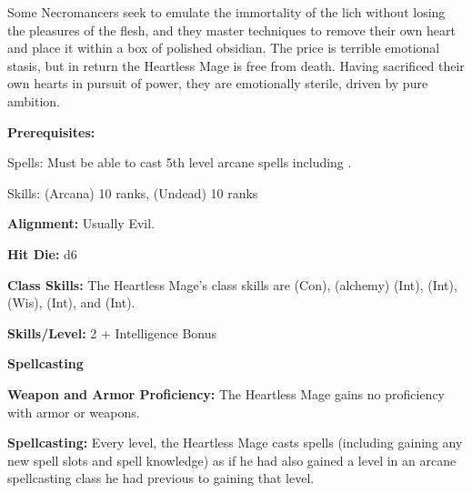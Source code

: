 
Some Necromancers seek to emulate the immortality of the lich without losing the pleasures of the flesh, and they master techniques to remove their own heart and place it within a box of polished obsidian. The price is terrible emotional stasis, but in return the Heartless Mage is free from death. Having sacrificed their own hearts in pursuit of power, they are emotionally sterile, driven by pure ambition.

\textbf{Prerequisites:} 
\begin{description*}
\item[\hspace*{1.5cm}Spells:] Must be able to cast 5th level arcane spells including .
\item[\hspace*{1.5cm}Skills:]  (Arcana) 10 ranks,  (Undead) 10 ranks
\end{description*}

\textbf{Alignment:} Usually Evil.

\textbf{Hit Die:} d6

\textbf{Class Skills:} The Heartless Mage's class skills are  (Con),  (alchemy) (Int),  (Int),  (Wis),  (Int), and  (Int).

\textbf{Skills/Level:} 2 + Intelligence Bonus

\poorbab{}
\poorfor{}
\poorref{}
\goodwil{}

\begin{extraclasstable}{\textbf{Spellcasting}}
\end{extraclasstable}

\classfeatures

\textbf{Weapon and Armor Proficiency:} The Heartless Mage gains no proficiency with armor or weapons.

\textbf{Spellcasting:} Every level, the Heartless Mage casts spells (including gaining any new spell slots and spell knowledge) as if he had also gained a level in an arcane spellcasting class he had previous to gaining that level.

